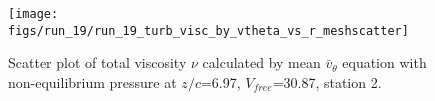 \begin{figure}[H]
\centering
\texttt{[image: figs/run\_19/run\_19\_turb\_visc\_by\_vtheta\_vs\_r\_meshscatter]}
\caption{Scatter plot of total viscosity $\nu$ calculated by mean $\bar{v}_{\theta}$ equation with non-equilibrium pressure at $z/c$=6.97, $V_{free}$=30.87, station 2.}
\label{fig:run_19_turb_visc_by_vtheta_vs_r_meshscatter}
\end{figure}



